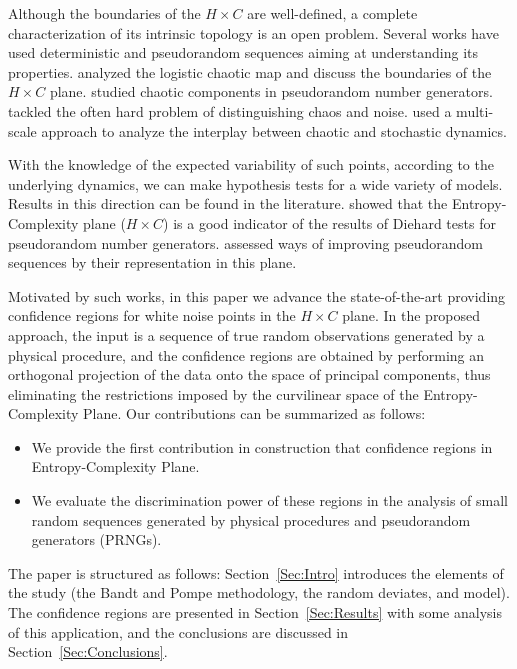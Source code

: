 
Although the boundaries of the $H\times C$ are well-defined, a complete characterization of its intrinsic topology is an open problem.
Several works have used deterministic and pseudorandom sequences aiming at understanding its properties.
\cite{GeneralizedStatisticalComplexityMeasuresGeometricalAnalyticalProperties} analyzed the logistic chaotic map and discuss the boundaries of the $H \times C$ plane.
\cite{De_Micco_2009} studied chaotic components in pseudorandom number generators.
\cite{DistinguishingNoiseFromChaos}  tackled the often hard problem of distinguishing chaos and noise.
\cite{DistinguishingChaoticStochasticDynamicsTimeSeriesMultiscaleSymbolicApproach} used a multi-scale approach to analyze the interplay between chaotic and stochastic dynamics.

With the knowledge of the expected variability of such points, according to the underlying dynamics, we can make hypothesis tests for a wide variety of models.
Results in this direction can be found in the literature.
\cite{RandomNumberGeneratorsCausality} showed that the Entropy-Complexity plane ($H\times C$) is a good indicator of the results of Diehard tests for pseudorandom number generators.
\cite{De_Micco_2008} assessed ways of improving pseudorandom sequences by their representation in this plane.

Motivated by such works, in this paper we advance the state-of-the-art providing confidence regions for white noise points in the $H\times C$ plane.
In the proposed approach, the input is a sequence of true random observations generated by a physical procedure, and the confidence regions are obtained by performing an orthogonal projection of the data onto the space of principal components, thus eliminating the restrictions imposed by the curvilinear space of the Entropy-Complexity Plane.
Our contributions can be summarized as follows:
\begin{itemize}
    \item We provide the first contribution in construction that confidence regions in Entropy-Complexity Plane.
    \item We evaluate the discrimination power of these regions in the analysis of small random sequences generated by physical procedures and pseudorandom generators (PRNGs).
\end{itemize}

The paper is structured as follows: Section~\ref{Sec:Intro} introduces the elements of the study (the Bandt and Pompe methodology, the random deviates, and model).
The confidence regions are presented in Section~\ref{Sec:Results} with some analysis of this application, and the conclusions are discussed in Section~\ref{Sec:Conclusions}.
